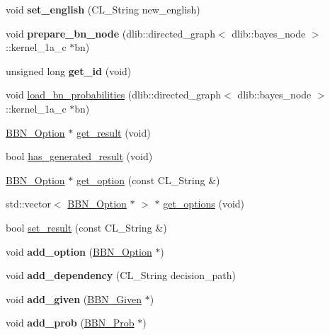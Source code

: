 \begin{DoxyCompactItemize}
\item 
\hypertarget{classBBN__Decision_ac6f6a45603dd38eea13caac9f1c5dbb7}{
void {\bfseries set\_\-english} (CL\_\-String new\_\-english)}
\label{classBBN__Decision_ac6f6a45603dd38eea13caac9f1c5dbb7}

\item 
\hypertarget{classBBN__Decision_afc6cf50aaf904ec0bf34eae13cc2d91a}{
void {\bfseries prepare\_\-bn\_\-node} (dlib::directed\_\-graph$<$ dlib::bayes\_\-node $>$::kernel\_\-1a\_\-c $\ast$bn)}
\label{classBBN__Decision_afc6cf50aaf904ec0bf34eae13cc2d91a}

\item 
\hypertarget{classBBN__Decision_a92e0f50bb7815b9ae1c7c0e0bab80c27}{
unsigned long {\bfseries get\_\-id} (void)}
\label{classBBN__Decision_a92e0f50bb7815b9ae1c7c0e0bab80c27}

\item 
void \hyperlink{classBBN__Decision_a1a4ff92ffa1b4c3abba092b07d6f9b93}{load\_\-bn\_\-probabilities} (dlib::directed\_\-graph$<$ dlib::bayes\_\-node $>$::kernel\_\-1a\_\-c $\ast$bn)
\item 
\hyperlink{classBBN__Option}{BBN\_\-Option} $\ast$ \hyperlink{classBBN__Decision_aea433e9e244fdbd7c11135b738e0476b}{get\_\-result} (void)
\item 
bool \hyperlink{classBBN__Decision_a2e3f0320f1016c3e35c5730fa5c948e7}{has\_\-generated\_\-result} (void)
\item 
\hyperlink{classBBN__Option}{BBN\_\-Option} $\ast$ \hyperlink{classBBN__Decision_a1e6a97fe500472d9ac2cffbb760e6f64}{get\_\-option} (const CL\_\-String \&)
\item 
std::vector$<$ \hyperlink{classBBN__Option}{BBN\_\-Option} $\ast$ $>$ $\ast$ \hyperlink{classBBN__Decision_a66f57c1bf4d3efe58c30ea737835d67a}{get\_\-options} (void)
\item 
bool \hyperlink{classBBN__Decision_a6a2a027baea04cbac8ff81711aac9d76}{set\_\-result} (const CL\_\-String \&)
\item 
\hypertarget{classBBN__Decision_afc979a53919de0f05fde87d0acd88775}{
void {\bfseries add\_\-option} (\hyperlink{classBBN__Option}{BBN\_\-Option} $\ast$)}
\label{classBBN__Decision_afc979a53919de0f05fde87d0acd88775}

\item 
\hypertarget{classBBN__Decision_a5b0de472ac977ae5f6ec381345f8d2b0}{
void {\bfseries add\_\-dependency} (CL\_\-String decision\_\-path)}
\label{classBBN__Decision_a5b0de472ac977ae5f6ec381345f8d2b0}

\item 
\hypertarget{classBBN__Decision_a0d554f4d8df133d2bc5d673b25472d9f}{
void {\bfseries add\_\-given} (\hyperlink{classBBN__Given}{BBN\_\-Given} $\ast$)}
\label{classBBN__Decision_a0d554f4d8df133d2bc5d673b25472d9f}

\item 
\hypertarget{classBBN__Decision_ab0313b6918df79389132d97b63c9b897}{
void {\bfseries add\_\-prob} (\hyperlink{classBBN__Prob}{BBN\_\-Prob} $\ast$)}
\label{classBBN__Decision_ab0313b6918df79389132d97b63c9b897}

\end{DoxyCompactItemize}


